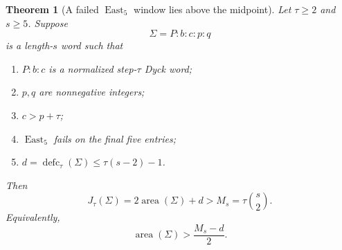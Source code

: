 \documentclass[11pt]{article}
\newtheorem{theorem}{Theorem}
\theoremstyle{definition}
\theoremstyle{remark}
\newcommand{\area}{\operatorname{area}}
\newcommand{\defc}{\operatorname{defc}}
\newcommand{\East}{\operatorname{East}}
\begin{document}
\begin{theorem}[A failed \(\East_5\) window lies above the midpoint]
\label{thm:local-obstruction}
Let \(\tau\ge2\) and \(s\ge5\).  Suppose
\[
  \Sigma=P:b:c:p:q
\]
is a length-\(s\) word such that
\begin{enumerate}[label=\textup{(\roman*)}]
  \item \(P:b:c\) is a normalized step-\(\tau\) Dyck word;
  \item \(p,q\) are nonnegative integers;
  \item \(c>p+\tau\);
  \item \(\East_5\) fails on the final five entries;
  \item \(d=\defc_\tau(\Sigma)\le\tau(s-2)-1\).
\end{enumerate}
Then
\begin{equation}
  J_\tau(\Sigma)=2\area(\Sigma)+d>M_s=\tau\binom{s}{2}.
  \label{eq:local-conclusion}
\end{equation}
Equivalently,
\[
  \area(\Sigma)>\frac{M_s-d}{2}.
\]
\end{theorem}
\end{document}
